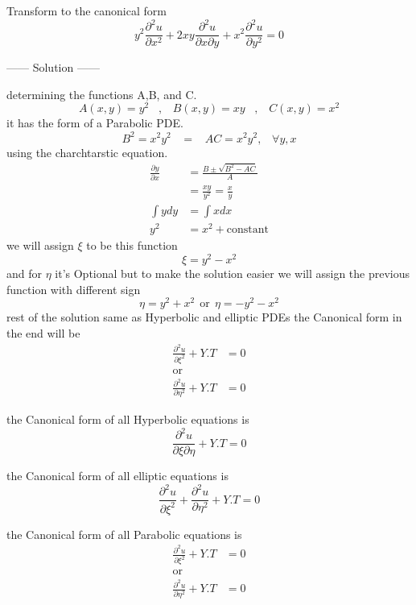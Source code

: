 \documentclass[]{article}
\begin{document}
\begin{example}
    Transform to the canonical form
    \[
        y^2\frac{\partial^2 u}{\partial x^2}+2xy\frac{\partial^2 u}{\partial x\partial y}+x^2\frac{\partial^2 u}{\partial y^2} = 0  
    \]
    \begin{center}
        ------ \textcolor{Solution}{Solution} ------ 
    \end{center}
    determining the functions A,B, and C.
    \[
        A\left(x,y\right)=y^2 \;\;\;,\;\;\; B\left(x,y\right)=xy \;\;\;,\;\;\; C\left(x,y\right)=x^2    
    \]
    it has the form of a Parabolic PDE.
    \[
        B^2 =x^2 y^2 \;\;\;=\;\;\; AC=x^2 y^2, \;\;\;\forall y, x  
    \]
    using the charchtarstic equation.
    \begin{align*}
        \frac{\partial y}{\partial x} &= \frac{B\pm\sqrt{B^2 -AC}}{A}
        \\
        &= \frac{xy}{y^2}=\frac{x}{y}
        \\
        \int y dy &= \int x dx 
        \\
        y^2 &= x^2 +\text{constant}
    \end{align*}
    we will assign $\xi$ to be this function
    \[
        \xi = y^2 - x^2
    \]
    and for $\eta$ it's Optional but to make the solution easier we will assign the previous function with different sign  
    \[
        \eta = y^2 + x^2 \ \ \text{or} \ \ \eta = - y^2 - x^2
    \]
    rest of the solution same as Hyperbolic and elliptic PDEs
    the Canonical form in the end will be 
    \begin{align*}
        \frac{\partial^2 u}{\partial\xi^2}+Y.T &=0
        \\
        \text{or}
        \\
        \frac{\partial^2 u}{\partial\eta^2}+Y.T &=0
    \end{align*}
\end{example}

\begin{observation}
    the Canonical form of all Hyperbolic equations is 
    \[
        \frac{\partial^2 u}{\partial\xi\partial\eta} +Y.T = 0
    \]
\end{observation}
\begin{observation}
    the Canonical form of all elliptic equations is 
    \[
        \frac{\partial^2 u}{\partial\xi^2}+\frac{\partial^2 u}{\partial\eta^2}+Y.T =0
    \]
\end{observation}
\begin{observation}
    the Canonical form of all Parabolic equations is 
    \begin{align*}
        \frac{\partial^2 u}{\partial\xi^2}+Y.T &=0
        \\
        \text{or}
        \\
        \frac{\partial^2 u}{\partial\eta^2}+Y.T &=0
    \end{align*}
\end{observation}
\end{document}
